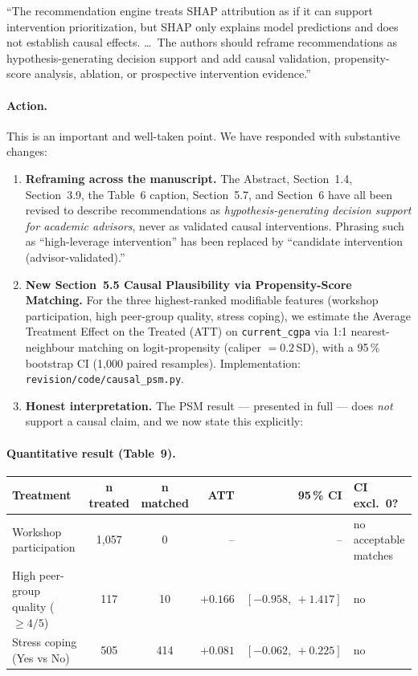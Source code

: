 \documentclass[11pt,a4paper]{article}
\newcommand{\filebox}[1]{\texttt{\small #1}}
\newcommand{\sectref}[1]{Section~#1}
\newcommand{\stress}[1]{\textbf{#1}}
\begin{document}
\begin{itemize}
\begin{reviewerquote}
``The recommendation engine treats SHAP attribution as if it can support intervention prioritization, but SHAP only explains model predictions and does not establish causal effects. \ldots\ The authors should reframe recommendations as hypothesis-generating decision support and add causal validation, propensity-score analysis, ablation, or prospective intervention evidence.''
\end{reviewerquote}

\paragraph{Action.} This is an important and well-taken point. We have responded with substantive changes:

\begin{enumerate}
  \item \stress{Reframing across the manuscript.} The Abstract, \sectref{1.4}, \sectref{3.9}, the Table~6 caption, \sectref{5.7}, and \sectref{6} have all been revised to describe recommendations as \emph{hypothesis-generating decision support for academic advisors}, never as validated causal interventions. Phrasing such as ``high-leverage intervention'' has been replaced by ``candidate intervention (advisor-validated).''
  \item \stress{New \sectref{5.5} Causal Plausibility via Propensity-Score Matching.} For the three highest-ranked modifiable features (workshop participation, high peer-group quality, stress coping), we estimate the Average Treatment Effect on the Treated (ATT) on \texttt{current\_cgpa} via 1{:}1 nearest-neighbour matching on logit-propensity (caliper $= 0.2$\,SD), with a 95\,\% bootstrap CI (1{,}000 paired resamples). Implementation: \filebox{revision/code/causal\_psm.py}.
  \item \stress{Honest interpretation.} The PSM result --- presented in full --- does \emph{not} support a causal claim, and we now state this explicitly:
\end{enumerate}

\paragraph{Quantitative result (Table~9).}

\begin{center}\small
\begin{tabular}{l c c r r l}
\toprule
\textbf{Treatment} & \textbf{n treated} & \textbf{n matched} & \textbf{ATT} & \textbf{95\,\% CI} & \textbf{CI excl.\ 0?} \\
\midrule
Workshop participation             & 1{,}057 & 0   & --    & --                & no acceptable matches \\
High peer-group quality ($\geq 4/5$) & 117    & 10  & $+0.166$ & $[-0.958,\ +1.417]$ & no \\
Stress coping (Yes vs No)          & 505     & 414 & $+0.081$ & $[-0.062,\ +0.225]$ & no \\
\bottomrule
\end{tabular}
\end{center}


\end{itemize}
\end{document}
